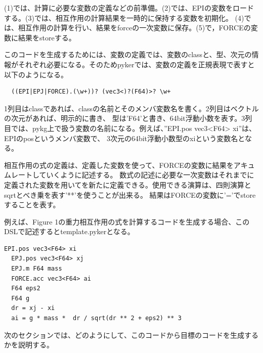 \documentclass{jarticle}
\begin{document}
  (1)では、計算に必要な変数の定義などの前準備。(2)では、EPIの変数をロードする。(3)では、相互作用の計算結果を一時的に保持する変数を初期化。
  (4)では、相互作用の計算を行い、結果をforceの一次変数に保存。(5)で，FORCEの変数に結果をstoreする。

  このコードを生成するためには、変数の定義では、変数のclassと、型、次元の情報がそれぞれ必要になる。そのためpykerでは、変数の定義を正規表現で表すと以下のようになる。
  \begin{lstlisting}
  ((EPI|EPJ|FORCE).(\w+))? (vec3<)?(F64)>? \w+
  \end{lstlisting}
  
  1列目はclassであれば、classの名前とそのメンバ変数名を書く。2列目はベクトルの次元があれば、明示的に書き、
  型は'F64'と書き、64bit浮動小数を表す。3列目では、pykg上で扱う変数の名前になる。例えば、”EPI.pos vec3<F64> xi”は、EPIのposというメンバ変数で、
  3次元の64bit浮動小数型のxiという変数名となる。
  
  相互作用の式の定義は、定義した変数を使って、FORCEの変数に結果をアキュムレートしていくように記述する。
  数式の記述に必要な一次変数はそれまでに定義された変数を用いてを新たに定義できる。使用できる演算は、四則演算とsqrtとべき乗を表す'**'を使うことが出来る。
  結果はFORCEの変数に'='でstoreすることを表す。
  
  例えば、Figure 1の重力相互作用の式を計算するコードを生成する場合、このDSLで記述するとtemplate.pykerとなる。

\begin{lstlisting}[frame=single, caption=hoge, label=fuga]
  EPI.pos vec3<F64> xi
  EPJ.pos vec3<F64> xj
  EPJ.m F64 mass
  FORCE.acc vec3<F64> ai
  F64 eps2
  F64 g
  dr = xj - xi
  ai = g * mass *  dr / sqrt(dr ** 2 + eps2) ** 3
\end{lstlisting}

次のセクションでは、どのようにして、このコードから目標のコードを生成するかを説明する。
\end{document}
